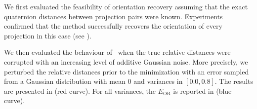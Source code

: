 
We first evaluated the feasibility of orientation recovery assuming that the exact quaternion distances between projection pairs were known.
Experiments confirmed that the method successfully recovers the orientation of every projection in this case (see ).

We then evaluated the behaviour of~ when the true relative distances were corrupted with an increasing level of additive Gaussian noise. More precisely, we perturbed the relative distances prior to the minimization with an error sampled from a Gaussian distribution with mean 0 and variances in $[0.0, 0.8]$.
The results are presented in  (red curve).
For all variances, the $E_\text{OR}$ is reported in  (blue curve).

